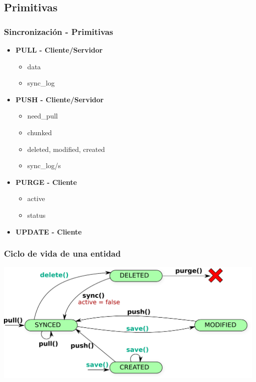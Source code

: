 \documentclass{beamer}
\begin{document}
\subsection{Primitivas}
\begin{frame}
    \frametitle{Sincronización - Primitivas}
    	\begin{itemize}
            \item{\bf PULL - Cliente/Servidor}
            	\begin{itemize}
                	\item{data}
                	\item{sync\_log}
          		\end{itemize}
            \item{\bf PUSH - Cliente/Servidor}
            	\begin{itemize}
                	\item{need\_pull}
                	\item{chunked}
                	\item{deleted, modified, created}
                	\item{sync\_log/s}
          		\end{itemize}
            \item{\bf PURGE - Cliente}
            	\begin{itemize}
                	\item{active}
                	\item{status}
                \end{itemize}
            \item{\bf UPDATE - Cliente} 
        \end{itemize}
\end{frame}

\begin{frame}
    \frametitle{Ciclo de vida de una entidad}
    \includegraphics[scale=0.55]{esquema_sync_client.pdf}
\end{frame}
\end{document}
